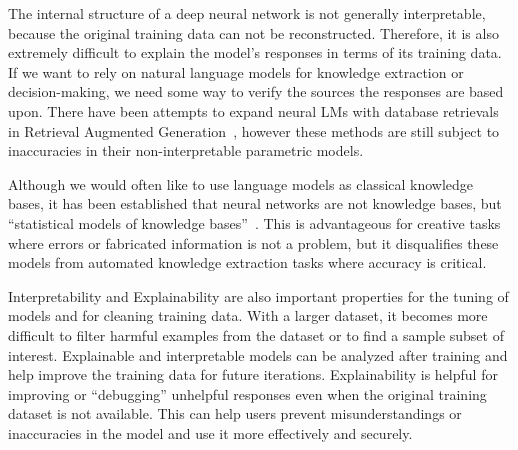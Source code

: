 \noindent
The internal structure of a deep neural network is not generally interpretable, because the original training data can not be reconstructed. Therefore, it is also extremely difficult to explain the model's responses in terms of its training data. If we want to rely on natural language models for knowledge extraction or decision-making, we need some way to verify the sources the responses are based upon. There have been attempts to expand neural LMs with database retrievals in Retrieval Augmented Generation~\cite{lewis2020retrieval}, however these methods are still subject to inaccuracies in their non-interpretable parametric models.

Although we would often like to use language models as classical knowledge bases, it has been established that neural networks are not knowledge bases, but ``statistical models of knowledge bases''~\cite{petroni2019language}. This is advantageous for creative tasks where errors or fabricated information is not a problem, but it disqualifies these models from automated knowledge extraction tasks where accuracy is critical.

\noindent
Interpretability and Explainability are also important properties for the tuning of models and for cleaning training data. With a larger dataset, it becomes more difficult to filter harmful examples from the dataset or to find a sample subset of interest. Explainable and interpretable models can be analyzed after training and help improve the training data for future iterations. Explainability is helpful for improving or ``debugging'' unhelpful responses even when the original training dataset is not available. This can help users prevent misunderstandings or inaccuracies in the model and use it more effectively and securely.


